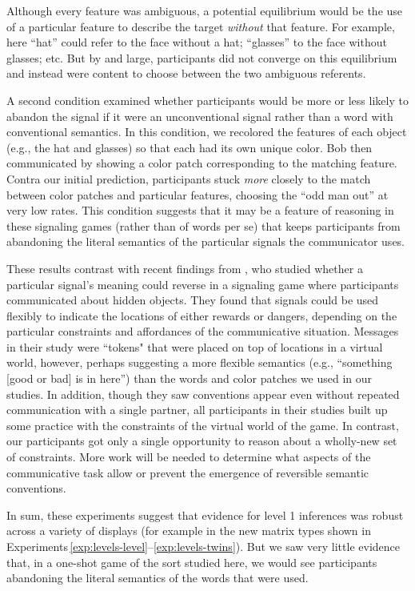 \documentclass[man,noapacite]{apa2}
\newcounter{Experiment}
\newcommand{\exptrefrange}[2]{Experiments\,\ref{#1}--\ref{#2}}
\begin{document}
\noindent Although every feature was ambiguous, a potential equilibrium would be the use of a particular feature to describe the target \emph{without} that feature. For example, here ``hat'' could refer to the face without a hat; ``glasses'' to the face without glasses; etc. But by and large, participants did not converge on this equilibrium and instead were content to choose between the two ambiguous referents.

A second condition examined whether participants would be more or less likely to abandon the signal if it were an unconventional signal rather than a word with conventional semantics. In this condition, we recolored the features of each object (e.g., the hat and glasses) so that each had its own unique color. Bob then communicated by showing a color patch corresponding to the matching feature. Contra our initial prediction, participants stuck \emph{more} closely to the match between color patches and particular features, choosing the ``odd man out'' at very low rates. This condition suggests that it may be a feature of reasoning in these signaling games (rather than of words per se) that keeps participants from abandoning the literal semantics of the particular signals the communicator uses.

These results contrast with recent findings from , who studied whether a particular signal's meaning could reverse in a signaling game where participants communicated about hidden objects. They found that signals could be used flexibly to indicate the locations of either rewards or dangers, depending on the particular constraints and affordances of the communicative situation. Messages in their study were ``tokens" that were placed on top of locations in a virtual world, however, perhaps suggesting a more flexible semantics (e.g., ``something [good or bad] is in here'') than the words and color patches we used in our studies. In addition, though they saw conventions appear even without repeated communication with a single partner, all participants in their studies built up some practice with the constraints of the virtual world of the game. In contrast, our participants got only a single opportunity to reason about a wholly-new set of constraints. More work will be needed to determine what aspects of the communicative task allow or prevent the emergence of reversible semantic conventions.

In sum, these experiments suggest that evidence for level 1 inferences was robust across a variety of displays (for example in the new matrix types shown in \exptrefrange{exp:levels-level}{exp:levels-twins}). But we saw very little evidence that, in a one-shot game of the sort studied here, we would see participants abandoning the literal semantics of the words that were used.
\end{document}
